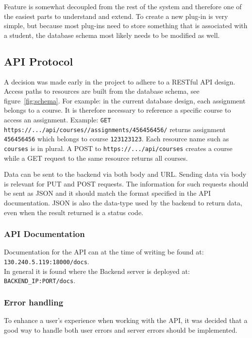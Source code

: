 Feature is somewhat decoupled from the rest of the system and therefore one of the easiest parts to understand and extend. To create a new plug-in is very simple, but because most plug-ins need to store something that is associated with a student, the database schema most likely needs to be modified as well.

\subsection{API Protocol}
A decision was made early in the project to adhere to a RESTful API design. Access paths to resources are built from the database schema, see figure~\ref{fig:schema}. For example: in the current database design, each assignment belongs to a course. It is therefore necessary to reference a specific course to access an assignment. Example: \texttt{GET https://.../api/courses//assignments/456456456/} returns assignment \texttt{456456456} which belongs to course \texttt{123123123}. Each resource name such as \texttt{courses} is in plural. A POST to \texttt{https://.../api/courses} creates a course while a GET request to the same resource returns all courses.

Data can be sent to the backend via both body and URL. Sending data via body is relevant for PUT and POST requests. The information for such requests should be sent as JSON and it should match the format specified in the API documentation. JSON is also the data-type used by the backend to return data, even when the result returned is a status code.

\subsubsection{API Documentation} \label{apidocs}
Documentation for the API can at the time of writing be found at: \\ \texttt{130.240.5.119:18000/docs}. \\
In general it is found where the Backend server is deployed at: \\ \texttt{BACKEND\_IP:PORT/docs}.

\subsubsection{Error handling}
To enhance a user's experience when working with the API, it was decided that a good way to handle both user errors and server errors should be implemented.


